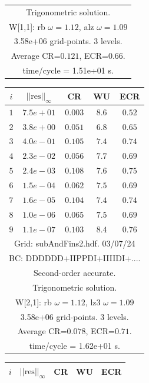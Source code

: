 \begin{table}[hbt]
\begin{center}
{\begin{tabular}{|c|c|c|c|c|}
\multicolumn{5}{|c|}{Trigonometric solution.}  \\
\multicolumn{5}{|c|}{W[1,1]: rb $\omega=1.12$, alz $\omega=1.09$}  \\
\multicolumn{5}{|c|}{3.58e+06 grid-points. 3 levels.}  \\
\multicolumn{5}{|c|}{Average CR=$0.121$, ECR=$0.66$.}  \\
\multicolumn{5}{|c|}{time/cycle = 1.51e+01 s.}  \\
\hline 
\end{tabular}
\begin{tabular}{|c|c|c|c|c|} \hline 
 $i$   & $\vert\vert\mbox{res}\vert\vert_\infty$  &  CR     &  WU    & ECR  \\   \hline 
 $ 1$  & $ 7.5e+01$ & $0.003$ & $ 8.6$ & $0.52$ \\ 
 $ 2$  & $ 3.8e+00$ & $0.051$ & $ 6.8$ & $0.65$ \\ 
 $ 3$  & $ 4.0e-01$ & $0.105$ & $ 7.4$ & $0.74$ \\ 
 $ 4$  & $ 2.3e-02$ & $0.056$ & $ 7.7$ & $0.69$ \\ 
 $ 5$  & $ 2.4e-03$ & $0.108$ & $ 7.6$ & $0.75$ \\ 
 $ 6$  & $ 1.5e-04$ & $0.062$ & $ 7.5$ & $0.69$ \\ 
 $ 7$  & $ 1.6e-05$ & $0.104$ & $ 7.4$ & $0.74$ \\ 
 $ 8$  & $ 1.0e-06$ & $0.065$ & $ 7.5$ & $0.69$ \\ 
 $ 9$  & $ 1.1e-07$ & $0.103$ & $ 8.4$ & $0.76$ \\ 
\hline 
\multicolumn{5}{|c|}{Grid: subAndFins2.hdf. 03/07/24}  \\
\multicolumn{5}{|c|}{BC: DDDDDD+IIPPDI+IIIIDI+....}  \\
\multicolumn{5}{|c|}{Second-order accurate.}  \\
\multicolumn{5}{|c|}{Trigonometric solution.}  \\
\multicolumn{5}{|c|}{W[2,1]: rb $\omega=1.12$, lz3 $\omega=1.09$}  \\
\multicolumn{5}{|c|}{3.58e+06 grid-points. 3 levels.}  \\
\multicolumn{5}{|c|}{Average CR=$0.078$, ECR=$0.71$.}  \\
\multicolumn{5}{|c|}{time/cycle = 1.62e+01 s.}  \\
\hline 
\end{tabular}
\begin{tabular}{|c|c|c|c|c|} \hline 
 $i$   & $\vert\vert\mbox{res}\vert\vert_\infty$  &  CR     &  WU    & ECR  \\   \hline 

\end{tabular}}
\end{center}
\end{table}
